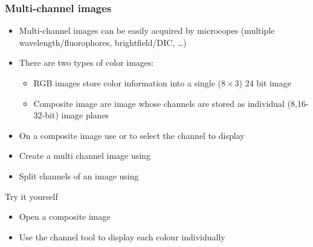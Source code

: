 \documentclass[ignorenonframetext,aspectratio=169,10pt,xcolor=table]{beamer}
\begin{document}
\begin{frame} \frametitle{Multi-channel images}
  \begin{itemize}
  \item Multi-channel images can be easily acquired by microcopes
    (multiple wavelength/fluorophores, brightfield/DIC, \dots)
  \item There are two types of color images:
    \begin{itemize}
    \item RGB images store color information into a single ($8 \times
      3$) 24 bit image
    \item Composite image are image whose channels are stored as
      individual (8,16-32-bit) image planes
    \end{itemize}
  \item On a composite image use  or
     to select the channel to display
  \item Create a multi channel image using 
  \item Split channels of an image using 
  \end{itemize}
  \begin{block}{Try it yourself}
    \begin{itemize}
    \item Open a composite image 
    \item Use the channel tool to display each colour individually
    \end{itemize}
  \end{block}
\end{frame}
\end{document}
